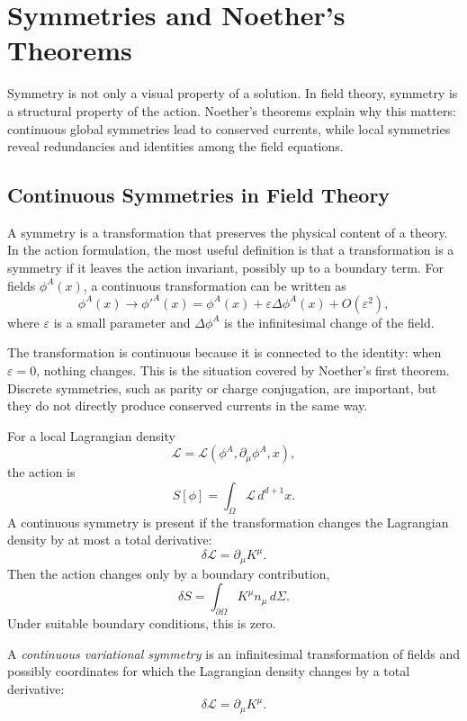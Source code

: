 \chapter{Symmetries and Noether's Theorems}

\begin{remarkbox}
Symmetry is not only a visual property of a solution. In field theory, symmetry
is a structural property of the action. Noether's theorems explain why this
matters: continuous global symmetries lead to conserved currents, while local
symmetries reveal redundancies and identities among the field equations.
\end{remarkbox}

\section{Continuous Symmetries in Field Theory}

A symmetry is a transformation that preserves the physical content of a theory.
In the action formulation, the most useful definition is that a transformation
is a symmetry if it leaves the action invariant, possibly up to a boundary term.
For fields \(\phi^A(x)\), a continuous transformation can be written as
\[
    \phi^A(x) \longrightarrow \phi'^A(x)
    = \phi^A(x)+\varepsilon\Delta\phi^A(x)+O(\varepsilon^2),
\]
where \(\varepsilon\) is a small parameter and \(\Delta\phi^A\) is the
infinitesimal change of the field.

The transformation is continuous because it is connected to the identity: when
\(\varepsilon=0\), nothing changes. This is the situation covered by Noether's
first theorem. Discrete symmetries, such as parity or charge conjugation, are
important, but they do not directly produce conserved currents in the same way.

For a local Lagrangian density
\[
    \mathcal{L}=\mathcal{L}(\phi^A,\partial_\mu\phi^A,x),
\]
the action is
\[
    S[\phi]=\int_\Omega \mathcal{L}\,d^{d+1}x.
\]
A continuous symmetry is present if the transformation changes the Lagrangian
density by at most a total derivative:
\[
    \delta\mathcal{L}=\partial_\mu K^\mu.
\]
Then the action changes only by a boundary contribution,
\[
    \delta S=\int_{\partial\Omega}K^\mu n_\mu\,d\Sigma.
\]
Under suitable boundary conditions, this is zero.

\begin{definitionbox}
A \emph{continuous variational symmetry} is an infinitesimal transformation of
fields and possibly coordinates for which the Lagrangian density changes by a
total derivative:
\[
    \delta\mathcal{L}=\partial_\mu K^\mu.
\]
\end{definitionbox}

